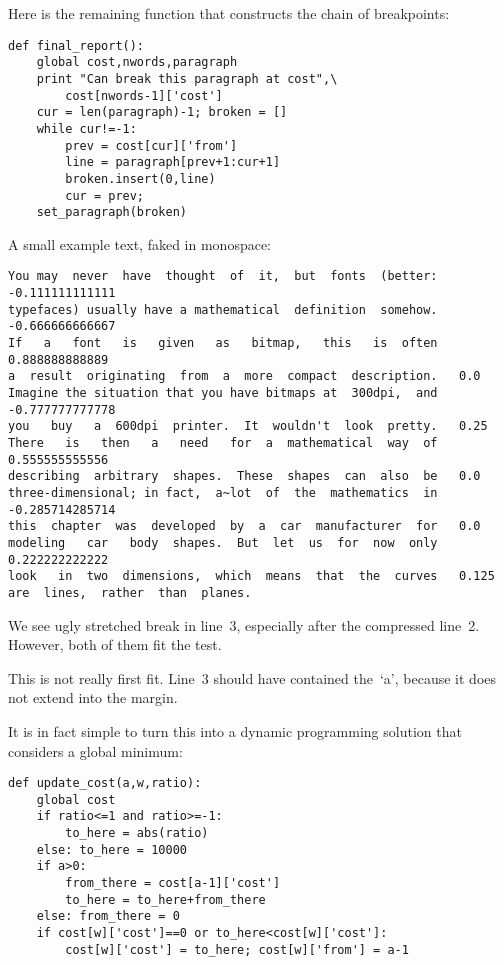 Here is the remaining function that constructs the chain of breakpoints:
\begin{verbatim}
def final_report():
    global cost,nwords,paragraph
    print "Can break this paragraph at cost",\
        cost[nwords-1]['cost']
    cur = len(paragraph)-1; broken = []
    while cur!=-1:
        prev = cost[cur]['from']
        line = paragraph[prev+1:cur+1]
        broken.insert(0,line)
        cur = prev;
    set_paragraph(broken)
\end{verbatim}

A small example text, faked in monospace:
\begin{footnotesize}
\begin{verbatim}
You may  never  have  thought  of  it,  but  fonts  (better:   -0.111111111111
typefaces) usually have a mathematical  definition  somehow.   -0.666666666667
If   a   font   is   given   as   bitmap,   this   is  often   0.888888888889
a  result  originating  from  a  more  compact  description.   0.0
Imagine the situation that you have bitmaps at  300dpi,  and   -0.777777777778
you   buy   a  600dpi  printer.  It  wouldn't  look  pretty.   0.25
There   is   then   a   need   for  a  mathematical  way  of   0.555555555556
describing  arbitrary  shapes.  These  shapes  can  also  be   0.0
three-dimensional; in fact,  a~lot  of  the  mathematics  in   -0.285714285714
this  chapter  was  developed  by  a  car  manufacturer  for   0.0
modeling   car   body  shapes.  But  let  us  for  now  only   0.222222222222
look   in  two  dimensions,  which  means  that  the  curves   0.125
are  lines,  rather  than  planes.
\end{verbatim}
\end{footnotesize}
We see ugly stretched break in line~3, especially after the compressed
line~2. However, both of them fit the test.
\begin{problem}
This is not really first fit. Line~3 should have contained the~`a',
because it does not extend into the margin.
\end{problem}

It is in fact simple to turn this into a dynamic programming solution
that considers a global minimum:
\begin{verbatim}
def update_cost(a,w,ratio):
    global cost
    if ratio<=1 and ratio>=-1:
        to_here = abs(ratio)
    else: to_here = 10000
    if a>0:
        from_there = cost[a-1]['cost']
        to_here = to_here+from_there
    else: from_there = 0
    if cost[w]['cost']==0 or to_here<cost[w]['cost']:
        cost[w]['cost'] = to_here; cost[w]['from'] = a-1
\end{verbatim}

